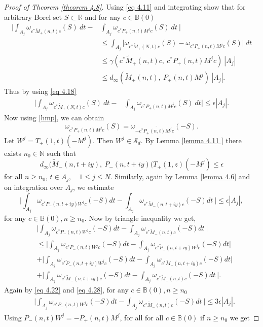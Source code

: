 \documentclass[reqno]{amsart}
\numberwithin{equation}{section}
\newcommand{\R}{\mathbb{R}}
\newcommand{\N}{\mathbb{N}}
\begin{document}
\begin{proof}[Proof of Theorem \ref{theorem 4.8}]
Using \eqref{eq 4.11} and integrating show that for arbitrary Borel set $S \subset \R$ and for any $c \in \mathbb B(0)$
  \begin{align*}  \Big | \int_{A_j} \omega_{c^* \tilde M_+(n,t)c} (S) \ dt -  & \int_{A_j} \omega_{c^*  P_+(n,t)M^jc}(S) \ dt\  \Big | \\   & \leq  \int_{A_j}  \Big | \omega_{c^* \tilde M_+(N,t)c} (S) - \omega_{c^*  P_+(n,t)M^jc}(S) \Big|\ dt \\ & \leq  \gamma ( c^* \tilde M_+(n,t)c, \ c^*P_+(n,t) M^jc ) \ |A_j| \\ & \leq d_{\infty}(\tilde M_+(n,t), \ P_+(n,t) M^j) \ |A_j|. \end{align*}
  Thus by using \eqref {eq 4.18}
   \begin{align} \label{ineq 1}  \Big | \int_{A_j} \omega_{c^* \tilde M_+(N,t)c} (S) \ dt -  & \int_{A_j} \omega_{c^*  P_+(n,t)M^jc}(S) \ dt \Big |  \leq \epsilon |A_j|. \end{align}
 Now using   \eqref{hmp}, we can obtain 
 \begin{equation} \label{omega} \omega_{c^*P_+(n,t)M^jc}(S) = \omega_{- \overline{c^*P_+(n,t)M^jc}}(-S).\end{equation}
 Let $W^j = T_+(1, t)(-M^j).$ Then $W^j \in \mathcal S_d .$  
By Lemma \ref{lemma 4.11 } there exists $n_0 \in \N $ such that
\begin{equation} \label{eq 4.26}  d_{\infty}(\tilde M_-(n,t+iy), \ P_-(n,t+iy)( T_+(1,z)(- M^j ) \leq \epsilon \end{equation}
 for all $ n\geq n_0$, $t \in A_j,\quad  1\leq j \leq N .$
Similarly, again by Lemma \ref{lemma 4.6} and on integration over $A_j$, we estimate
 \begin{equation} \label{eq 4.28} \Big | \int_{A_j} \omega_{c^* P_-(n, t+iy) W^jc}(-S) dt - \int_{A_j} \omega_{c^* \tilde M_-(n, t+iy)c}(-S) dt\  \Big | \leq \epsilon |A_j| ,\end{equation} for any $c \in \mathbb B(0), n\geq n_0.$
Now by triangle inequality we get,
\begin{align*}   &\Big | \int_{A_j} \omega_{c^* P_-(n, t) W^jc}(-S) dt -  \int_{A_j} \omega_{c^* \tilde M_-(n, t)c}(-S) dt\  \Big | 
\\ & \leq  \Big | \int_{A_j} \omega_{c^* P_-(n,t) W^j c}(-S) dt - \int_{A_j} \omega_{c^* \tilde P_-(n, t+iy)W^jc}(-S) dt \Big | \\  & +\Big |\int_{A_j} \omega_{c^* \tilde P_-(n, t+iy)W^jc}(-S) dt - \int_{A_j} \omega_{c^*  \tilde M_-(n, t+iy)c}(-S) dt  \Big | \\ & + \Big |
\int_{A_j} \omega_{c^*  \tilde M_-(n, t+iy)c}(-S) dt  -
\int_{A_j} \omega_{c^* \tilde M_-(n, t)c}(-S) dt\  \Big | .\end{align*} 
Again by  \eqref{eq 4.22}   and \eqref{eq 4.28}, for any $c \in \mathbb B(0),  n\geq n_0$
\begin{align} \label{ineq2}  &\Big | \int_{A_j} \omega_{c^* P_-(n,t) W^j c}(-S) dt -  \int_{A_j} \omega_{c^* \tilde M_-(n,t)c}(-S) dt\  \Big | \leq 3\epsilon |A_j| . 
\end{align} 
  Using $ P_-(n,t) W^j = - \overline {P_+(n,t)M^j}$, for all for all $c\in \mathbb B(0)$ if $n\geq n_0 $ we get
 

\end{proof}
\end{document}
